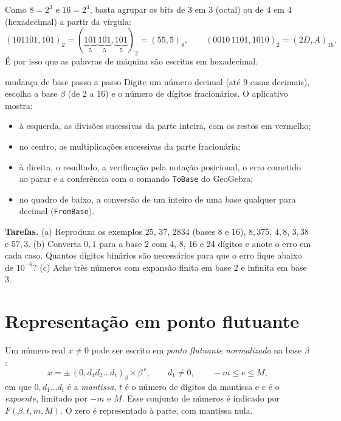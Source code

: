 Como $8=2^3$ e $16=2^4$, basta agrupar os bits de 3 em 3 (octal) ou de 4 em 4 (hexadecimal) a partir da
vírgula:
\[
(101101{,}101)_2=(\underbrace{101}_{5}\,\underbrace{101}_{5}{,}\underbrace{101}_{5})_2=(55{,}5)_8,
\qquad
(0010\,1101{,}1010)_2=(2D{,}A)_{16} .
\]
É por isso que as palavras de máquina são escritas em hexadecimal.

\begin{atividade}{mudança de base passo a passo}{\arqBase}
Digite um número decimal (até 9 casas decimais), escolha a base $\beta$ (de 2 a 16) e o número de
dígitos fracionários. O aplicativo mostra:
\begin{itemize}[nosep]
  \item à esquerda, as divisões sucessivas da parte inteira, com os restos em vermelho;
  \item no centro, as multiplicações sucessivas da parte fracionária;
  \item à direita, o resultado, a verificação pela notação posicional, o erro cometido ao parar e a
        conferência com o comando \texttt{ToBase} do GeoGebra;
  \item no quadro de baixo, a conversão de um inteiro de uma base qualquer para decimal
        (\texttt{FromBase}).
\end{itemize}
\textbf{Tarefas.} (a) Reproduza os exemplos $25$, $37$, $2834$ (bases 8 e 16), $8{,}375$, $4{,}8$,
$3{,}38$ e $57{,}3$.
(b) Converta $0{,}1$ para a base 2 com 4, 8, 16 e 24 dígitos e anote o erro em cada caso.
Quantos dígitos binários são necessários para que o erro fique abaixo de $10^{-6}$?
(c) Ache três números com expansão finita em base 2 e infinita em base 3.
\end{atividade}

\section{Representação em ponto flutuante}

Um número real $x\neq0$ pode ser escrito em \emph{ponto flutuante normalizado} na base $\beta$:
\[
x=\pm\,(0{,}d_1d_2\dots d_t)_\beta\times\beta^{\,e},\qquad d_1\neq0,\qquad -m\le e\le M,
\]
em que $0{,}d_1\dots d_t$ é a \emph{mantissa}, $t$ é o número de dígitos da mantissa e $e$ é o
\emph{expoente}, limitado por $-m$ e $M$. Esse conjunto de números é indicado por $F(\beta,t,m,M)$.
O zero é representado à parte, com mantissa nula.

